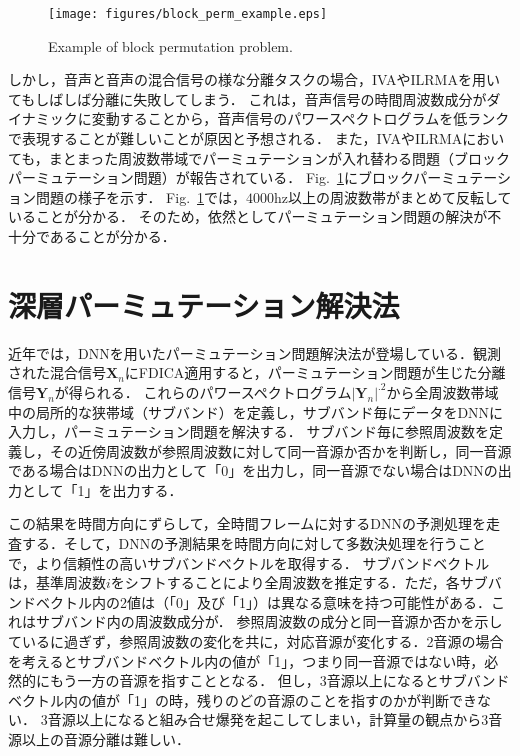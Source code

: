 \begin{figure}[t]
  \begin{center}
      \texttt{[image: figures/block\_perm\_example.eps]}
  \end{center}
  \vspace{-8pt}
\caption{Example of block permutation problem.}
\label{fig:bp}
\end{figure}

しかし，音声と音声の混合信号の様な分離タスクの場合，IVAやILRMAを用いてもしばしば分離に失敗してしまう．
これは，音声信号の時間周波数成分がダイナミックに変動することから，音声信号のパワースペクトログラムを低ランクで表現することが難しいことが原因と予想される．
また，IVAやILRMAにおいても，まとまった周波数帯域でパーミュテーションが入れ替わる問題（ブロックパーミュテーション問題）\cite{brock_p}が報告されている．
Fig.~\ref{fig:bp}にブロックパーミュテーション問題の様子を示す．
Fig.~\ref{fig:bp}では，$4000$hz以上の周波数帯がまとめて反転していることが分かる．
そのため，依然としてパーミュテーション問題の解決が不十分であることが分かる．


\section{深層パーミュテーション解決法}
\label{sec:DNNs}

近年では，DNNを用いたパーミュテーション問題解決法が登場している．観測された混合信号$\bm{X}_n$にFDICA適用すると，パーミュテーション問題が生じた分離信号$\bm{Y}_n$が得られる．
これらのパワースペクトログラム$|\bm{Y}_n|^{.2}$から全周波数帯域中の局所的な狭帯域（サブバンド）を定義し，サブバンド毎にデータをDNNに入力し，パーミュテーション問題を解決する．
サブバンド毎に参照周波数を定義し，その近傍周波数が参照周波数に対して同一音源か否かを判断し，同一音源である場合はDNNの出力として「0」を出力し，同一音源でない場合はDNNの出力として「1」を出力する．

この結果を時間方向にずらして，全時間フレームに対するDNNの予測処理を走査する．そして，DNNの予測結果を時間方向に対して多数決処理を行うことで，より信頼性の高いサブバンドベクトルを取得する．
サブバンドベクトルは，基準周波数$i$をシフトすることにより全周波数を推定する．ただ，各サブバンドベクトル内の2値は（「0」及び「1」）は異なる意味を持つ可能性がある．これはサブバンド内の周波数成分が．
参照周波数の成分と同一音源か否かを示しているに過ぎず，参照周波数の変化を共に，対応音源が変化する．2音源の場合を考えるとサブバンドベクトル内の値が「1」，つまり同一音源ではない時，必然的にもう一方の音源を指すこととなる．
但し，3音源以上になるとサブバンドベクトル内の値が「1」の時，残りのどの音源のことを指すのかが判断できない．
3音源以上になると組み合せ爆発を起こしてしまい，計算量の観点から3音源以上の音源分離は難しい．

